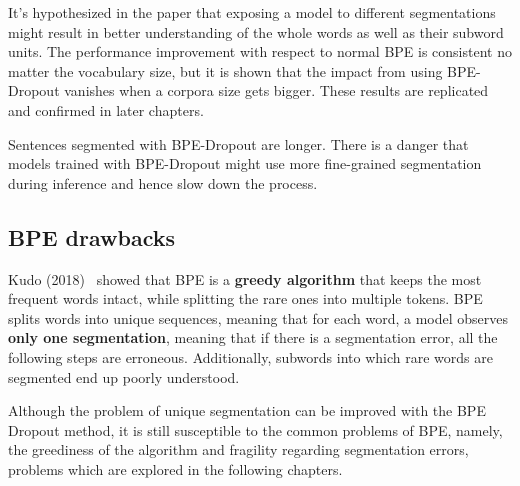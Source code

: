 It's hypothesized in the paper that exposing a model to different segmentations might result in better understanding of the whole words as well as their subword units. The performance improvement with respect to normal BPE is consistent no matter the vocabulary size, but it is shown that the impact from using BPE-Dropout vanishes when a corpora size gets bigger. These results are replicated and confirmed in later chapters.

Sentences segmented with BPE-Dropout are longer. There is a danger that models trained with BPE-Dropout might use more fine-grained segmentation during inference and hence slow down the process.

\subsection{BPE drawbacks}

Kudo (2018)~\cite{kudo-2018-subword} showed that BPE is a \textbf{greedy algorithm} that keeps the most frequent words intact, while splitting the rare ones into multiple tokens. BPE splits words into unique sequences, meaning that for each word, a model observes \textbf{only one segmentation}, meaning that if there is a segmentation error, all the following steps are erroneous. Additionally, subwords into which rare words are segmented end up poorly understood.

Although the problem of unique segmentation can be improved with the BPE Dropout method, it is still susceptible to the common problems of BPE, namely, the greediness of the algorithm and fragility regarding segmentation errors, problems which are explored in the following chapters.
